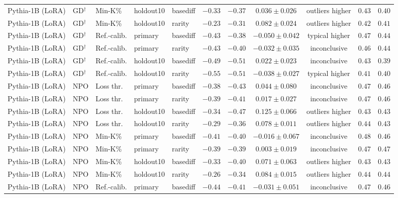 \begin{table}[t]
\begin{tabular*}{\textwidth}{@{\extracolsep{\fill}}lllllcccccc@{}}
Pythia-1B (LoRA) & GD$^{\dagger}$ & Min-K\% & holdout10 & basediff & $-0.33$ & $-0.37$ & $0.036 \pm 0.026$ & outliers higher & $0.43$ & $0.40$ \\
Pythia-1B (LoRA) & GD$^{\dagger}$ & Min-K\% & holdout10 & rarity & $-0.23$ & $-0.31$ & $0.082 \pm 0.024$ & outliers higher & $0.42$ & $0.41$ \\
Pythia-1B (LoRA) & GD$^{\dagger}$ & Ref.-calib. & primary & basediff & $-0.43$ & $-0.38$ & $-0.050 \pm 0.042$ & typical higher & $0.47$ & $0.44$ \\
Pythia-1B (LoRA) & GD$^{\dagger}$ & Ref.-calib. & primary & rarity & $-0.43$ & $-0.40$ & $-0.032 \pm 0.035$ & inconclusive & $0.46$ & $0.44$ \\
Pythia-1B (LoRA) & GD$^{\dagger}$ & Ref.-calib. & holdout10 & basediff & $-0.49$ & $-0.51$ & $0.022 \pm 0.023$ & inconclusive & $0.43$ & $0.39$ \\
Pythia-1B (LoRA) & GD$^{\dagger}$ & Ref.-calib. & holdout10 & rarity & $-0.55$ & $-0.51$ & $-0.038 \pm 0.027$ & typical higher & $0.41$ & $0.40$ \\
Pythia-1B (LoRA) & NPO & Loss thr. & primary & basediff & $-0.38$ & $-0.43$ & $0.044 \pm 0.080$ & inconclusive & $0.47$ & $0.46$ \\
Pythia-1B (LoRA) & NPO & Loss thr. & primary & rarity & $-0.39$ & $-0.41$ & $0.017 \pm 0.027$ & inconclusive & $0.47$ & $0.46$ \\
Pythia-1B (LoRA) & NPO & Loss thr. & holdout10 & basediff & $-0.34$ & $-0.47$ & $0.125 \pm 0.066$ & outliers higher & $0.43$ & $0.43$ \\
Pythia-1B (LoRA) & NPO & Loss thr. & holdout10 & rarity & $-0.29$ & $-0.36$ & $0.078 \pm 0.011$ & outliers higher & $0.44$ & $0.43$ \\
Pythia-1B (LoRA) & NPO & Min-K\% & primary & basediff & $-0.41$ & $-0.40$ & $-0.016 \pm 0.067$ & inconclusive & $0.48$ & $0.46$ \\
Pythia-1B (LoRA) & NPO & Min-K\% & primary & rarity & $-0.39$ & $-0.39$ & $0.003 \pm 0.019$ & inconclusive & $0.47$ & $0.47$ \\
Pythia-1B (LoRA) & NPO & Min-K\% & holdout10 & basediff & $-0.33$ & $-0.40$ & $0.071 \pm 0.063$ & outliers higher & $0.43$ & $0.43$ \\
Pythia-1B (LoRA) & NPO & Min-K\% & holdout10 & rarity & $-0.26$ & $-0.34$ & $0.084 \pm 0.015$ & outliers higher & $0.44$ & $0.44$ \\
Pythia-1B (LoRA) & NPO & Ref.-calib. & primary & basediff & $-0.44$ & $-0.41$ & $-0.031 \pm 0.051$ & inconclusive & $0.47$ & $0.46$ \\

\end{tabular*}
\end{table}
